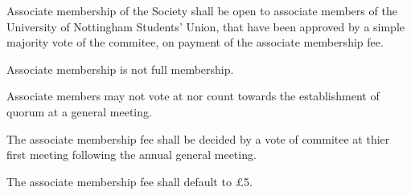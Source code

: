 \begin{clause}  
  Associate membership of the Society shall be open to associate members of the University of Nottingham Students' Union, that have been approved by a simple majority vote of the commitee, on payment of the associate membership fee.
\end{clause}

\begin{subclause}
  Associate membership is not full membership.
\end{subclause}

\begin{subclause}
  Associate members may not vote at nor count towards the establishment of quorum at a general meeting.
\end{subclause}

\begin{subclause}
  The associate membership fee shall be decided by a vote of commitee at thier first meeting following the annual general meeting.
\end{subclause}

\begin{subclause}
  The associate membership fee shall default to \pounds5.
\end{subclause}
